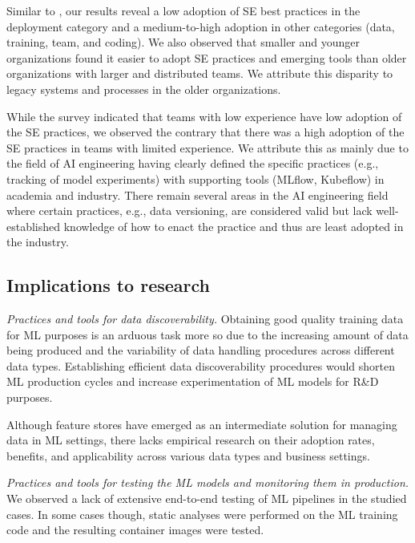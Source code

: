 Similar to \cite{Serban2020Practices}, our results reveal a low adoption of SE best practices in the deployment category and a medium-to-high adoption in other categories (data, training, team, and coding). We also observed that smaller and younger organizations found it easier to adopt SE practices and emerging tools than older organizations with larger and distributed teams. We attribute this disparity to legacy systems and processes in the older organizations.

While the survey indicated that teams with low experience have low adoption of the SE practices, we observed the contrary that there was a high adoption of the SE practices in teams with limited experience. We attribute this as mainly due to the field of AI engineering having clearly defined the specific practices (e.g., tracking of model experiments) with supporting tools (MLflow, Kubeflow) in academia and industry. There remain several areas in the AI engineering field where certain practices, e.g., data versioning, are considered valid but lack well-established knowledge of how to enact the practice and thus are least adopted in the industry.


\subsection{Implications to research}
\textit{Practices and tools for data discoverability.} Obtaining good quality training data for ML purposes is an arduous task more so due to the increasing amount of data being produced and the variability of data handling procedures across different data types. Establishing efficient data discoverability procedures would shorten ML production cycles and increase experimentation of ML models for R\&D purposes.

Although feature stores have emerged as an intermediate solution for managing data in ML settings, there lacks empirical research on their adoption rates, benefits, and applicability across various data types and business settings.%

\textit{Practices and tools for testing the ML models and monitoring them in production.} We observed a lack of extensive end-to-end testing of ML pipelines in the studied cases. In some cases though, static analyses were performed on the ML training code and the resulting container images were tested. 

